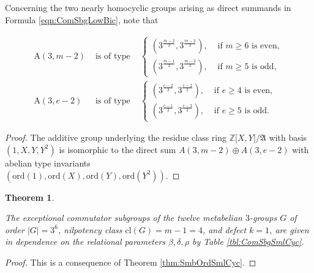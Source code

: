 \documentclass{amsart}
\newtheorem{theorem}{Theorem}[section]
\theoremstyle{definition}
\numberwithin{equation}{section}
\begin{document}
\noindent
Concerning the two nearly homocyclic groups arising as direct summands in Formula
\eqref{eqn:ComSbgLowBic},
note that
 
\begin{eqnarray*}
\label{eqn:LowBic}
\mathrm{A}(3,m-2)&\text{ is of type }&
\begin{cases}
\left(3^{\frac{m-2}{2}},3^{\frac{m-2}{2}}\right),&\text{ if }m\ge 6\text{ is even},\\
\left(3^{\frac{m-1}{2}},3^{\frac{m-3}{2}}\right),&\text{ if }m\ge 5\text{ is odd},
\end{cases}\\
\mathrm{A}(3,e-2)&\text{ is of type }&
\begin{cases}
\left(3^{\frac{e-2}{2}},3^{\frac{e-2}{2}}\right),&\text{ if }e\ge 4\text{ is even},\\
\left(3^{\frac{e-1}{2}},3^{\frac{e-3}{2}}\right),&\text{ if }e\ge 5\text{ is odd}.
\end{cases}
\end{eqnarray*}

\begin{proof}
The additive group underlying the residue class ring
\(\mathbb{Z}\lbrack X,Y\rbrack/\mathfrak{A}\)
with basis \((1,X,Y,Y^2)\) is isomorphic to the direct sum
\(A(3,m-2)\oplus A(3,e-2)\)
with abelian type invariants\\
\(\left(\mathrm{ord}(1),\mathrm{ord}(X),\mathrm{ord}(Y),\mathrm{ord}(Y^2)\right)\).
\end{proof}


\begin{theorem}
\label{thm:ComSbgSmlCyc}

The exceptional commutator subgroups of the twelve metabelian \(3\)-groups \(G\)
of order \(\lvert G\rvert=3^6\), nilpotency class \(\mathrm{cl}(G)=m-1=4\), and defect \(k=1\),
are given in dependence on the relational parameters \(\beta,\delta,\rho\) by Table
\ref{tbl:ComSbgSmlCyc}.

\end{theorem}

\begin{proof}
This is a consequence of Theorem
\ref{thm:SmbOrdSmlCyc}.
\end{proof}
\end{document}
